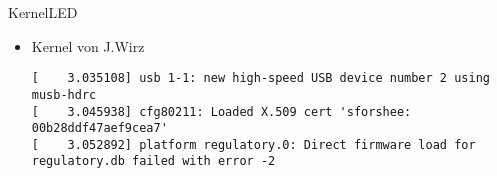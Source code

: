 \documentclass{beamer}
\begin{document}
\begin{frame}{Kernel}{LED}
\begin{itemize}
 \item Kernel von J.Wirz
 {\tiny
  \begin{verbatim}
[    3.035108] usb 1-1: new high-speed USB device number 2 using musb-hdrc
[    3.045938] cfg80211: Loaded X.509 cert 'sforshee: 00b28ddf47aef9cea7'
[    3.052892] platform regulatory.0: Direct firmware load for regulatory.db failed with error -2
  \end{verbatim}
 }
\end{itemize}
\end{frame}
\end{document}
